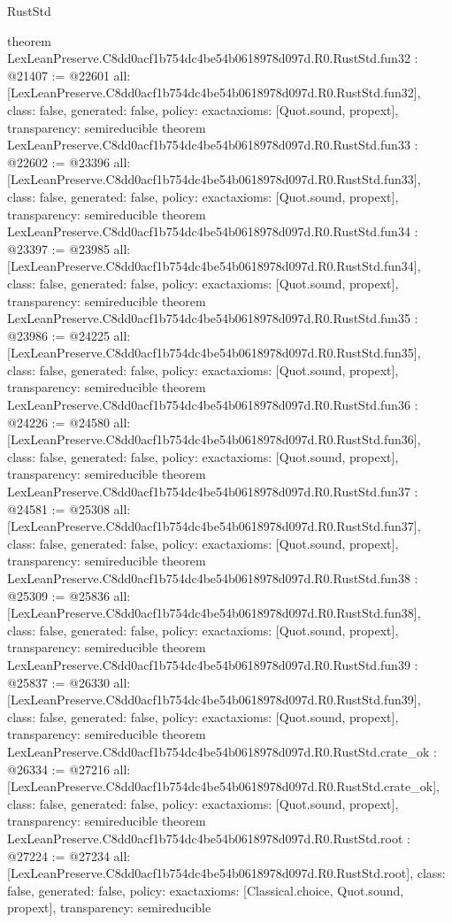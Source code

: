 \begin{lexlean}{RustStd}
\begin{coremodule}
{}
theorem LexLeanPreserve.C8dd0acf1b754dc4be54b0618978d097d.R0.RustStd.fun32 : @21407 := @22601 {
  all: [LexLeanPreserve.C8dd0acf1b754dc4be54b0618978d097d.R0.RustStd.fun32],
  class: false,
  generated: false,
  policy: exact{axioms: [Quot.sound, propext]},
  transparency: semireducible
}
theorem LexLeanPreserve.C8dd0acf1b754dc4be54b0618978d097d.R0.RustStd.fun33 : @22602 := @23396 {
  all: [LexLeanPreserve.C8dd0acf1b754dc4be54b0618978d097d.R0.RustStd.fun33],
  class: false,
  generated: false,
  policy: exact{axioms: [Quot.sound, propext]},
  transparency: semireducible
}
theorem LexLeanPreserve.C8dd0acf1b754dc4be54b0618978d097d.R0.RustStd.fun34 : @23397 := @23985 {
  all: [LexLeanPreserve.C8dd0acf1b754dc4be54b0618978d097d.R0.RustStd.fun34],
  class: false,
  generated: false,
  policy: exact{axioms: [Quot.sound, propext]},
  transparency: semireducible
}
theorem LexLeanPreserve.C8dd0acf1b754dc4be54b0618978d097d.R0.RustStd.fun35 : @23986 := @24225 {
  all: [LexLeanPreserve.C8dd0acf1b754dc4be54b0618978d097d.R0.RustStd.fun35],
  class: false,
  generated: false,
  policy: exact{axioms: [Quot.sound, propext]},
  transparency: semireducible
}
theorem LexLeanPreserve.C8dd0acf1b754dc4be54b0618978d097d.R0.RustStd.fun36 : @24226 := @24580 {
  all: [LexLeanPreserve.C8dd0acf1b754dc4be54b0618978d097d.R0.RustStd.fun36],
  class: false,
  generated: false,
  policy: exact{axioms: [Quot.sound, propext]},
  transparency: semireducible
}
theorem LexLeanPreserve.C8dd0acf1b754dc4be54b0618978d097d.R0.RustStd.fun37 : @24581 := @25308 {
  all: [LexLeanPreserve.C8dd0acf1b754dc4be54b0618978d097d.R0.RustStd.fun37],
  class: false,
  generated: false,
  policy: exact{axioms: [Quot.sound, propext]},
  transparency: semireducible
}
theorem LexLeanPreserve.C8dd0acf1b754dc4be54b0618978d097d.R0.RustStd.fun38 : @25309 := @25836 {
  all: [LexLeanPreserve.C8dd0acf1b754dc4be54b0618978d097d.R0.RustStd.fun38],
  class: false,
  generated: false,
  policy: exact{axioms: [Quot.sound, propext]},
  transparency: semireducible
}
theorem LexLeanPreserve.C8dd0acf1b754dc4be54b0618978d097d.R0.RustStd.fun39 : @25837 := @26330 {
  all: [LexLeanPreserve.C8dd0acf1b754dc4be54b0618978d097d.R0.RustStd.fun39],
  class: false,
  generated: false,
  policy: exact{axioms: [Quot.sound, propext]},
  transparency: semireducible
}
theorem LexLeanPreserve.C8dd0acf1b754dc4be54b0618978d097d.R0.RustStd.crate_ok : @26334 := @27216 {
  all: [LexLeanPreserve.C8dd0acf1b754dc4be54b0618978d097d.R0.RustStd.crate_ok],
  class: false,
  generated: false,
  policy: exact{axioms: [Quot.sound, propext]},
  transparency: semireducible
}
theorem LexLeanPreserve.C8dd0acf1b754dc4be54b0618978d097d.R0.RustStd.root : @27224 := @27234 {
  all: [LexLeanPreserve.C8dd0acf1b754dc4be54b0618978d097d.R0.RustStd.root],
  class: false,
  generated: false,
  policy: exact{axioms: [Classical.choice, Quot.sound, propext]},
  transparency: semireducible
}


\end{coremodule}
\end{lexlean}

